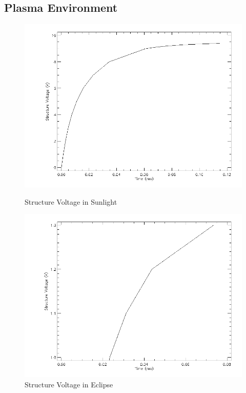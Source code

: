 \subsection{Plasma Environment}
\begin{figure}[!htbp]
  \centering
  \begin{minipage}[b]{0.45\textwidth}
    \includegraphics[width=\textwidth]{spenvis/sunlight_voltage}
    \caption{Structure Voltage in Sunlight}
    \label{fig:volt_sun}
  \end{minipage}
  \hfill
  \begin{minipage}[b]{0.45\textwidth}
    \includegraphics[width=\textwidth]{spenvis/eclipse_voltage}
    \caption{Structure Voltage in Eclipse}
    \label{fig:volt_eclipse}
  \end{minipage}
\end{figure}

